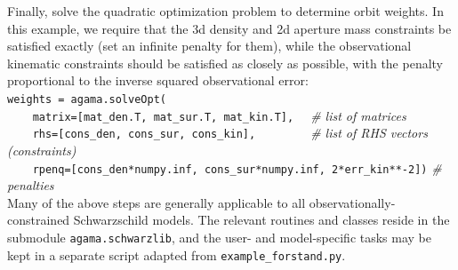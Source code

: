 \documentclass[12pt]{article}
\begin{document}
Finally, solve the quadratic optimization problem to determine orbit weights. In this example, we require that the 3d density and 2d aperture mass constraints be satisfied exactly (set an infinite penalty for them), while the observational kinematic constraints should be satisfied as closely as possible, with the penalty proportional to the inverse squared observational error:\\[2mm]
\texttt{weights = agama.solveOpt(\\
\mbox{}~~~~matrix=[mat_den.T, mat_sur.T, mat_kin.T],}
\textit{\color{Sepia} \ \ \# list of matrices}\\
\texttt{\mbox{}~~~~rhs=[cons_den, cons_sur, cons_kin],~~~~~~\mbox{}}
\textit{\color{Sepia} \ \ \# list of RHS vectors (constraints)}\\
\texttt{\mbox{}~~~~rpenq=[cons_den*numpy.inf, cons_sur*numpy.inf, 2*err_kin**-2])}
\textit{\color{Sepia}\# penalties}\\[3mm]
Many of the above steps are generally applicable to all observationally-constrained Schwarzschild models. The relevant routines and classes reside in the submodule \texttt{agama.schwarzlib}, and the user- and model-specific tasks may be kept in a separate script adapted from \texttt{example_forstand.py}.


\newpage
{}
\end{document}

